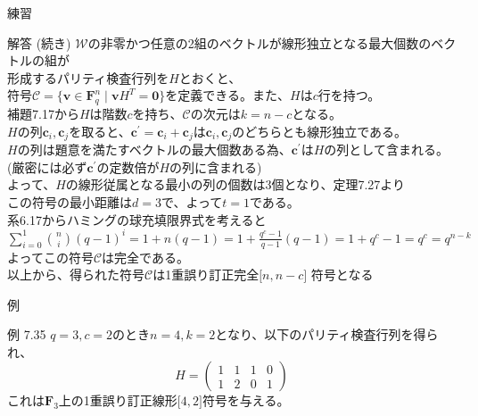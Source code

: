 \documentclass[dvipdfmx,10pt,jsarticle]{beamer}
\newcommand{\F}{\mathbf{F}}
\newcommand{\code}[1]{\mathcal{#1}}
\newcommand{\vs}[1]{\mathcal{#1}}
\newcommand{\sets}[1]{\lbrace{}  #1 \rbrace}
\newcommand{\bracket}[1]{\lbrack{} #1 \rbrack}
\newcommand{\vcode}[2]{$\bracket{#1 , #2}$}
\renewcommand{\vec}[1]{\mathbf{#1}}
\begin{document}
  \begin{frame}{練習}
    \begin{block}{解答 (続き)}
      $\vs{W}$の非零かつ任意の2組のベクトルが線形独立となる最大個数のベクトルの組が \\
      形成するパリティ検査行列を$H$とおくと、\\
      符号$\code{C} = \sets{\vec{v} \in \F_q^n \mid \vec{v} H^T = \vec{0}}$を定義できる。また、$H$は$c$行を持つ。\\
      補題7.17から$H$は階数$c$を持ち、$\code{C}$の次元は$k = n - c$となる。\\
      $H$の列$\vec{c}_i,\vec{c}_j$を取ると、$\vec{c}^\prime  = \vec{c}_i + \vec{c}_j$は$\vec{c}_i, \vec{c}_j$のどちらとも線形独立である。\\
      $H$の列は題意を満たすベクトルの最大個数ある為、$\vec{c}^\prime$は$H$の列として含まれる。 \\
      (厳密には必ず$\vec{c}^\prime$の定数倍が$H$の列に含まれる) \\
      よって、$H$の線形従属となる最小の列の個数は3個となり、定理7.27より\\
      この符号の最小距離は$d=3$で、よって$t=1$である。\\
      系6.17からハミングの球充填限界式を考えると$\sum_{i=0}^{1} \binom ni {(q-1)}^i = 1 + n (q - 1) = 1 + \frac{q^c - 1}{q - 1} (q - 1) = 1 + q^c - 1 = q^c = q^{n-k}$ \\
      よってこの符号$\code{C}$は完全である。\\
      以上から、得られた符号$\code{C}$は1重誤り訂正完全\vcode{n}{n-c} 符号となる
    \end{block}
  \end{frame}
  \begin{frame}{例}
    \begin{block}{例 7.35}
      $q=3, c=2$のとき$n=4, k = 2$となり、以下のパリティ検査行列を得られ、
      \[ H = \begin{pmatrix}
          1 & 1 & 1 & 0 \\
          1 & 2 & 0 & 1
      \end{pmatrix} \]
      これは$\F_3$上の1重誤り訂正線形\vcode42符号を与える。
    \end{block}
  \end{frame}
\end{document}
